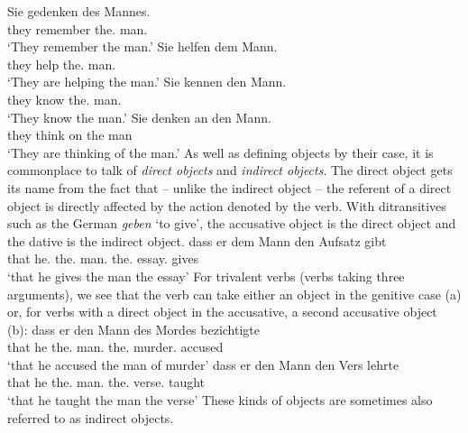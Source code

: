 {
\eal
\ex 
\gll Sie gedenken des Mannes.\\
	 they remember the.\gen{} man.\gen{}\\
\glt `They remember the man.'
\ex 
\gll Sie helfen dem Mann.\\
	 they help the.\dat{} man.\dat{}\\
\glt `They are helping the man.'
\ex 
\gll Sie kennen den Mann.\\
	 they know the.\acc{} man.\acc{}\\
\glt `They know the man.'
\ex 
\gll Sie denken an den Mann.\\
	 they think on the man\\
\glt `They are thinking of the man.'
\zl
As well as defining objects by their case, it is commonplace to talk of \emph{direct objects} and \emph{indirect objects}.
The direct object gets its name from the fact that -- unlike the indirect object -- the referent of a direct object is directly affected by the action denoted by the
verb.
With ditransitives such as the German \emph{geben} `to give', the accusative object is the direct object and the dative is the indirect object.
\ea
\gll dass er dem Mann den Aufsatz gibt\\
	 that he.\nom{} the.\dat{} man.\dat{} the.\acc{} essay.\acc{} gives\\
\glt `that he gives the man the essay'
\z
For trivalent verbs (verbs taking three arguments), we see that the verb can take either an object in the genitive case (a) or, for verbs with a direct object in the accusative, 
a second accusative object (b):
\eal
\ex 
\gll dass er den Mann des Mordes bezichtigte\\
	 that he the.\acc{} man.\acc{} the.\gen{} murder.\gen{} accused\\
\glt `that he accused the man of murder'
\ex 
\gll dass er den Mann den Vers lehrte\\
	 that he the.\acc{} man.\acc{} the.\acc{} verse.\acc{} taught\\
\glt `that he taught the man the verse'
\zl
These kinds of objects are sometimes also referred to as indirect objects.

}
